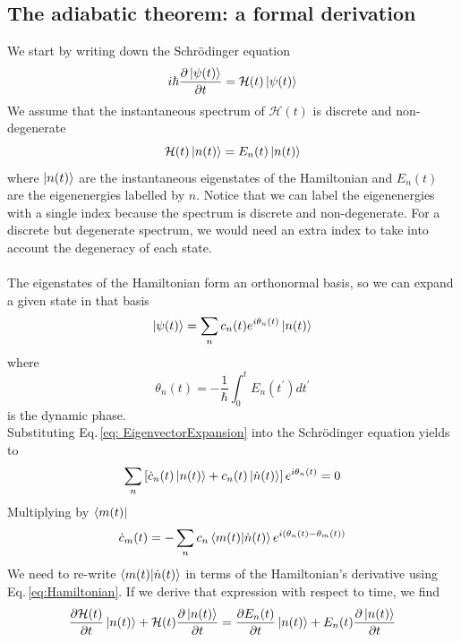 \subsection{The adiabatic theorem: a formal derivation}
We start by writing down the Schrödinger equation
\begin{equation}
    i\hbar \frac{\partial \ket{\psi(t)}}{\partial t} = \mathcal{H}(t)\ket{\psi(t)}
\end{equation}
We assume that the instantaneous spectrum of $\mathcal{H}(t)$ is discrete and non-degenerate
\begin{equation}
\label{eq:Hamiltonian}
    \mathcal{H}(t) \ket{n(t)} = E_{n}(t)\ket{n(t)}
\end{equation}
where $\ket{n(t)}$ are the instantaneous eigenstates of the Hamiltonian and $E_{n}(t)$ are the eigenenergies labelled by $n$. Notice that we can label the eigenenergies with a single index because the spectrum is discrete and non-degenerate. For a discrete but degenerate spectrum, we would need an extra index to take into account the degeneracy of each state.\\\\
The eigenstates of the Hamiltonian form an orthonormal basis, so we can expand a given state in that basis
\begin{equation}
\label{eq: EigenvectorExpansion}
    \ket{\psi(t)} = \sum_{n}c_{n}(t)e^{i\theta_{n}(t)} \ket{n(t)}
\end{equation}
where
\begin{equation}
    \theta_{n}(t) = -\frac{1}{\hbar}\int_{0}^{t}E_{n}(t^{\prime})dt^{\prime}
\end{equation}
is the dynamic phase.\\
Substituting Eq.\,\eqref{eq: EigenvectorExpansion} into the Schrödinger equation yields to
\begin{equation}
    \sum_{n}\left[\dot{c}_{n}(t)\ket{n(t)} + c_{n}(t)\ket{\dot{n}(t)}\right]e^{i\theta_{n}(t)} = 0
\end{equation}
Multiplying by $\bra{m(t)}$
\begin{equation}
\label{eq:Coefficients}
    \dot{c}_{m}(t) = - \sum_{n}c_{n}\braket{m(t)|\dot{n}(t)}e^{i\left(\theta_{n}(t) - \theta_{m}(t)\right)}
\end{equation}
We need to re-write $\braket{m(t)|\dot{n}(t)}$ in terms of the Hamiltonian's derivative using Eq.\,\eqref{eq:Hamiltonian}. If we derive that expression with respect to time, we find
\begin{equation}
    \frac{\partial \mathcal{H}(t)}{\partial t}\ket{n(t)} + \mathcal{H}(t)\frac{\partial \ket{n(t)}}{\partial t} = \frac{\partial E_{n}(t)}{\partial t} \ket{n(t)} + E_{n}(t)\frac{\partial \ket{n(t)}}{\partial t} 
\end{equation}
